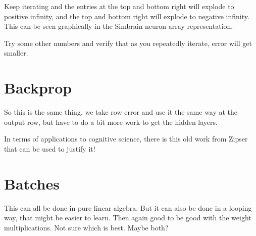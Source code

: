  Keep iterating and the entries at the top and bottom right will explode to positive infinity, and the top and bottom right will explode to negative infinity. This can be seen graphically in the Simbrain neuron array representation.
 
Try some other numbers and verify that as you repeatedly iterate, error will get smaller.



\section{Backprop}

So this is the same thing, we take row error and use it the same way at the output row, but have to do a bit more work to get the hidden layers.

In terms of applications to cognitive science, there is this old work from Zipser that can be used to justify it!

\section{Batches}

This can all be done in pure linear algebra. But it can also be done in a looping way, that might be easier to learn. Then again good to be good with the weight multiplications. Not sure which is best. Maybe both?
